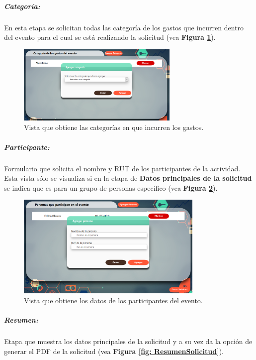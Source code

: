     \subparagraph{\emph{Categoría: }} En esta etapa se solicitan todas las categoría de los gastos que incurren dentro del evento para el cual se está realizando la solicitud (vea \textbf{Figura \ref{fig: Categorias}}).

    \begin{figure}[h]
        \centering
        \includegraphics[width= 0.69\textwidth]{Imagenes/Categoria.PNG}
        \caption{\label{fig: Categorias}Vista que obtiene las categorías en que incurren los gastos.}
    \end{figure}

    \subparagraph{\emph{Participante: }} Formulario que solicita el nombre y RUT de los participantes de la actividad. Esta vista sólo se visualiza si en la etapa de \textbf{Datos principales de la solicitud} se indica que es para un grupo de personas específico (vea \textbf{Figura \ref{fig: Personas}}). 

    \begin{figure}[h]
        \centering
        \includegraphics[width= 0.8\textwidth]{Imagenes/AgregarPersonas.PNG}
        \caption{\label{fig: Personas}Vista que obtiene los datos de los participantes del evento.}
    \end{figure}

    \subparagraph{\emph{Resumen: }} Etapa que muestra los datos principales de la solicitud y a su vez da la opción de generar el PDF de la solicitud (vea \textbf{Figura \ref{fig: ResumenSolicitud}}).

